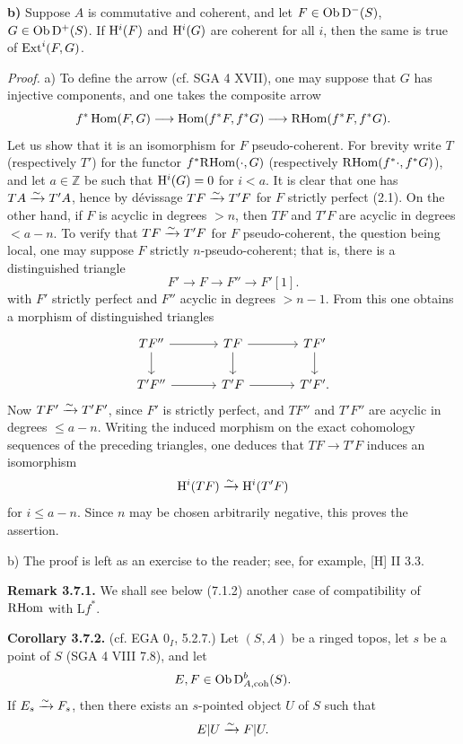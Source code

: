 \documentclass[11pt]{article}
\begin{document}
\textbf{b)} Suppose \(A\) is commutative and coherent, and let \(F\in\operatorname{Ob}\mathrm D^-(S)\), \(G\in\operatorname{Ob}\mathrm D^+(S)\). If \(\mathrm H^i(F)\) and \(\mathrm H^i(G)\) are coherent for all \(i\), then the same is true of \(\operatorname{Ext}^i(F,G)\).

\emph{Proof.} a) To define the arrow (cf. SGA 4 XVII), one may suppose that \(G\) has injective components, and one takes the composite arrow
\[
  f^*\operatorname{Hom}(F,G)\longrightarrow \operatorname{Hom}(f^*F,f^*G)
  \longrightarrow \mathrm R\!\operatorname{Hom}(f^*F,f^*G).
\]
Let us show that it is an isomorphism for \(F\) pseudo-coherent. For brevity write \(T\) (respectively \(T'\)) for the functor \(f^*\mathrm R\!\operatorname{Hom}(\cdot,G)\) (respectively \(\mathrm R\!\operatorname{Hom}(f^*\cdot,f^*G)\)), and let \(a\in\mathbb Z\) be such that \(\mathrm H^i(G)=0\) for \(i<a\). It is clear that one has \(TA\xrightarrow{\sim} T'A\), hence by dévissage \(TF\xrightarrow{\sim} T'F\) for \(F\) strictly perfect (2.1). On the other hand, if \(F\) is acyclic in degrees \(>n\), then \(TF\) and \(T'F\) are acyclic in degrees \(<a-n\). To verify that \(TF\xrightarrow{\sim} T'F\) for \(F\) pseudo-coherent, the question being local, one may suppose \(F\) strictly \(n\)-pseudo-coherent; that is, there is a distinguished triangle
\[
  F'\longrightarrow F\longrightarrow F''\longrightarrow F'[1].
\]
with \(F'\) strictly perfect and \(F''\) acyclic in degrees \(>n-1\). From this one obtains a morphism of distinguished triangles
\[
\begin{tikzcd}[column sep=large]
TF'' \arrow[r] \arrow[d] & TF \arrow[r] \arrow[d] & TF' \arrow[d] \\
T'F'' \arrow[r] & T'F \arrow[r] & T'F' .
\end{tikzcd}
\]
Now \(TF'\xrightarrow{\sim} T'F'\), since \(F'\) is strictly perfect, and \(TF''\) and \(T'F''\) are acyclic in degrees \(\leq a-n\). Writing the induced morphism on the exact cohomology sequences of the preceding triangles, one deduces that \(TF\to T'F\) induces an isomorphism
\[
  \mathrm H^i(TF)\xrightarrow{\sim} \mathrm H^i(T'F)
\]
for \(i\leq a-n\). Since \(n\) may be chosen arbitrarily negative, this proves the assertion.

b) The proof is left as an exercise to the reader; see, for example, [H] II 3.3.

\textbf{Remark 3.7.1.} We shall see below (7.1.2) another case of compatibility of \(\mathrm R\!\operatorname{Hom}\) with \(\mathrm L f^*\).

\textbf{Corollary 3.7.2.} (cf. EGA \(0_I\), 5.2.7.) Let \((S,A)\) be a ringed topos, let \(s\) be a point of \(S\) (SGA 4 VIII 7.8), and let
\[
  E,F\in\operatorname{Ob}\mathrm D^b_{A,\mathrm{coh}}(S).
\]
If \(E_s\xrightarrow{\sim} F_s\), then there exists an \(s\)-pointed object \(U\) of \(S\) such that
\[
  E|U\xrightarrow{\sim} F|U.
\]
\end{document}
